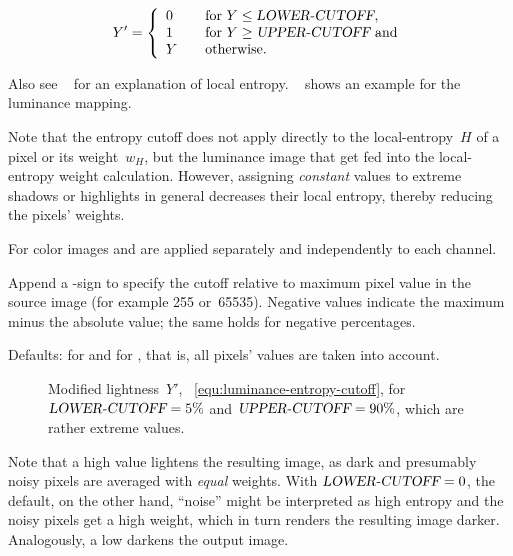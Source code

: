\begin{codelist}
  \begin{equation}\label{equ:luminance-entropy-cutoff}
  Y' = \left\{
  \begin{array}{ll}
    0 & \quad \mbox{for }Y \le \textsl{LOWER-CUTOFF}, \\
    1 & \quad \mbox{for }Y \ge \textsl{UPPER-CUTOFF}\mbox{ and} \\
    Y & \quad \mbox{otherwise.}
  \end{array}
  \right.
  \end{equation}

  Also see \sectionName~ for an explanation of local
  entropy.  \figureName~ shows an example for the luminance mapping.

  Note that the entropy cutoff does not apply directly to the local-entropy~$H$ of a pixel or
  its weight~$w_H$, but the luminance image that get fed into the local-entropy weight
  calculation.  However, assigning \emph{constant} values to extreme shadows or highlights
  in general decreases their local entropy, thereby reducing the pixels' weights.

  For color images  and  are applied separately and
  independently to each channel.

  Append a \sample{\%}-sign to specify the cutoff relative to maximum pixel value in the source
  image (for example 255 or~65535).  Negative  values indicate the maximum
  minus the absolute  value; the same holds for negative percentages.

  Defaults:  for  and
   for , that is, all pixels' values
  are taken into account.

  \begin{figure}
    \begin{maxipage}
      \centering
    \end{maxipage}

    \caption[Entropy cutoff function]{\label{fig:entropy-cutoff}%
      Modified lightness~$Y'$, \equationabbr~\ref{equ:luminance-entropy-cutoff}, for
      $\textsl{LOWER-CUTOFF} = 5\%$ and $\textsl{UPPER-CUTOFF} = 90\%$, which are rather
      extreme values.}
  \end{figure}

  \begin{geeknote}
    Note that a high  value lightens the resulting image, as dark and
    presumably noisy pixels are averaged with \emph{equal} weights.  With
    $\textsl{LOWER-CUTOFF} = 0$, the default, on the other hand, ``noise'' might be interpreted
    as high entropy and the noisy pixels get a high weight, which in turn renders the resulting
    image darker.  Analogously, a low  darkens the output image.
  \end{geeknote}


\end{codelist}
